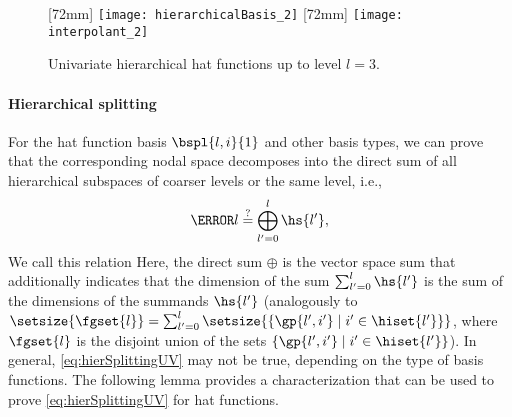 \begin{figure}
  [72mm]{%
    \texttt{[image: hierarchicalBasis\_2]}%
  }%
  \hfill%
  [72mm]{%
    \texttt{[image: interpolant\_2]}%
  }%
  \caption[%
    Univariate hierarchical hat functions%
  ]{%
    Univariate hierarchical hat functions up to level $l = 3$.%
  }%
  \label{fig:hierarchicalHat}%
\end{figure}

\paragraph{Hierarchical splitting}

For the hat function basis $\bspl{l,i}{1}$ and other basis types,
we can prove that the corresponding nodal space
decomposes into the direct sum of all
hierarchical subspaces of coarser levels or the same level, i.e.,
\begin{equation}
  \label{eq:hierSplittingUV}
  \ns{l}
  \overset{?}{=} \bigoplus_{l'=0}^l \hs{l'},
\end{equation}
We call this relation 
Here, the direct sum $\oplus$ is
the vector space sum that additionally indicates
that the dimension of the sum $\sum_{l'=0}^l \hs{l'}$ is the sum
of the dimensions of the summands $\hs{l'}$
(analogously to
$\setsize{\fgset{l}}
= \sum_{l'=0}^l \setsize{\{\gp{l',i'} \mid i' \in \hiset{l'}\}}$,
where $\fgset{l}$ is the disjoint union of the sets
$\{\gp{l',i'} \mid i' \in \hiset{l'}\}$).
In general, \eqref{eq:hierSplittingUV} may not be true,
depending on the type of basis functions.
The following lemma provides a characterization
that can be used to prove \eqref{eq:hierSplittingUV} for hat functions.

\vspace*{\fill}
\pagebreak

